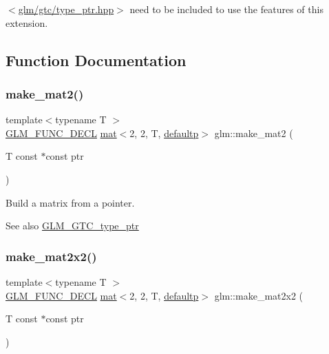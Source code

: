 $<$\hyperlink{type__ptr_8hpp}{glm/gtc/type\+\_\+ptr.\+hpp}$>$ need to be included to use the features of this extension. 

\subsection{Function Documentation}
\mbox{\label{group__gtc__type__ptr_ga04409e74dc3da251d2501acf5b4b546c}} 
\subsubsection{\texorpdfstring{make\+\_\+mat2()}{make\_mat2()}}
{\footnotesize\ttfamily template$<$typename T $>$ \\
\hyperlink{setup_8hpp_ab2d052de21a70539923e9bcbf6e83a51}{G\+L\+M\+\_\+\+F\+U\+N\+C\+\_\+\+D\+E\+CL} \hyperlink{structglm_1_1mat}{mat}$<$2, 2, T, \hyperlink{namespaceglm_a36ed105b07c7746804d7fdc7cc90ff25a9d21ccd8b5a009ec7eb7677befc3bf51}{defaultp}$>$ glm\+::make\+\_\+mat2 (\begin{DoxyParamCaption}\item[{T const $\ast$const}]{ptr }\end{DoxyParamCaption})}

Build a matrix from a pointer. \begin{DoxySeeAlso}{See also}
\hyperlink{group__gtc__type__ptr}{G\+L\+M\+\_\+\+G\+T\+C\+\_\+type\+\_\+ptr} 
\end{DoxySeeAlso}
\mbox{\label{group__gtc__type__ptr_gae49e1c7bcd5abec74d1c34155031f663}} 
\subsubsection{\texorpdfstring{make\+\_\+mat2x2()}{make\_mat2x2()}}
{\footnotesize\ttfamily template$<$typename T $>$ \\
\hyperlink{setup_8hpp_ab2d052de21a70539923e9bcbf6e83a51}{G\+L\+M\+\_\+\+F\+U\+N\+C\+\_\+\+D\+E\+CL} \hyperlink{structglm_1_1mat}{mat}$<$2, 2, T, \hyperlink{namespaceglm_a36ed105b07c7746804d7fdc7cc90ff25a9d21ccd8b5a009ec7eb7677befc3bf51}{defaultp}$>$ glm\+::make\+\_\+mat2x2 (\begin{DoxyParamCaption}\item[{T const $\ast$const}]{ptr }\end{DoxyParamCaption})}

